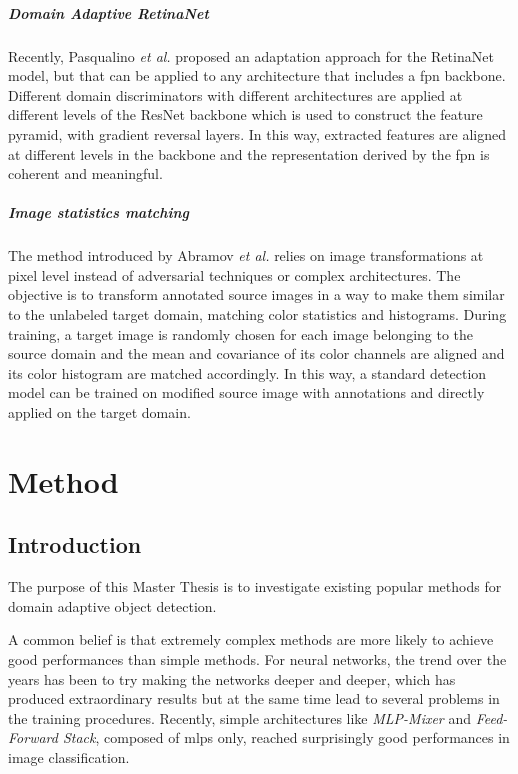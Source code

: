 \documentclass[%
    corpo=12pt,
    twoside,
    stile=classica,   
    tipotesi=magistrale,
    evenboxes,
    english,
	numerazioneromana,
]{toptesi}
\begin{document}
\paragraph{Domain Adaptive RetinaNet}\label{sec:daretinanet}
Recently, Pasqualino \emph{et al.}\cite{pasqualino2020unsupervised} proposed an adaptation approach for the RetinaNet model, but that can be applied to any architecture that includes a \gls{fpn} backbone. Different domain discriminators with different architectures are applied at different levels of the ResNet backbone which is used to construct the feature pyramid, with gradient reversal layers. In this way, extracted features are aligned at different levels in the backbone and the representation derived by the \gls{fpn} is coherent and meaningful.

\paragraph{Image statistics matching}\label{sec:kis}
The method introduced by Abramov \emph{et al.}\cite{abramov2020simple} relies on image transformations at pixel level instead of adversarial techniques or complex architectures. The objective is to transform annotated source images in a way to make them similar to the unlabeled target domain, matching color statistics and histograms. During training, a target image is randomly chosen for each image belonging to the source domain and the mean and covariance of its color channels are aligned and its color histogram are matched accordingly. In this way, a standard detection model can be trained on modified source image with annotations and directly applied on the target domain.



\chapter{Method}
\section{Introduction}
The purpose of this Master Thesis is to investigate existing popular methods for domain adaptive object detection.

A common belief is that extremely complex methods are more likely to achieve good performances than simple methods. For neural networks, the trend over the years has been to try making the networks deeper and deeper, which has produced extraordinary results but at the same time lead to several problems in the training procedures. Recently, simple architectures like \textit{MLP-Mixer}\cite{tolstikhin2021mlpmixer} and \textit{Feed-Forward Stack}\cite{melaskyriazi2021need}, composed of \glspl{mlp} only, reached surprisingly good performances in image classification.
\end{document}
